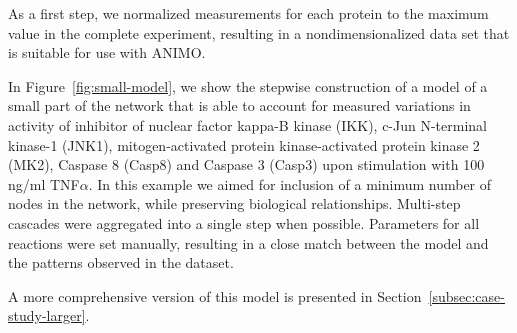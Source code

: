 As a first step, we normalized measurements for each protein to the
maximum value in the complete experiment, resulting in a nondimensionalized data set that is suitable for use with ANIMO.


In Figure~\ref{fig:small-model}, we show the stepwise construction of a model of a small part of the network that is
able to account for measured variations in activity of inhibitor of nuclear factor kappa-B kinase (IKK), c-Jun N-terminal kinase-1 (JNK1),
mitogen-activated protein kinase-activated protein kinase 2 (MK2), Caspase 8 (Casp8) and Caspase 3 (Casp3) upon stimulation with 100
ng/ml TNF$\alpha$. In this example we aimed for inclusion of a minimum number of nodes in the network, while preserving biological relationships.
Multi-step cascades were aggregated into a single step when possible. Parameters for all reactions were set manually, resulting in a close
match between the model and the patterns observed in the dataset.

A more comprehensive version of this model is presented in Section~\ref{subsec:case-study-larger}.

